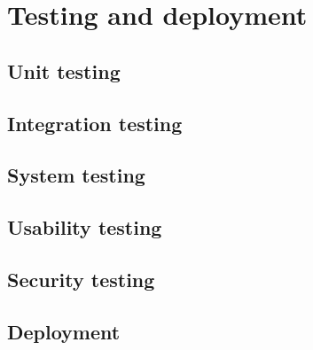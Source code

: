 \chapter{Testing and deployment}

\section{Unit testing}

\section{Integration testing}

\section{System testing}

\section{Usability testing}

\section{Security testing}

\section{Deployment}
